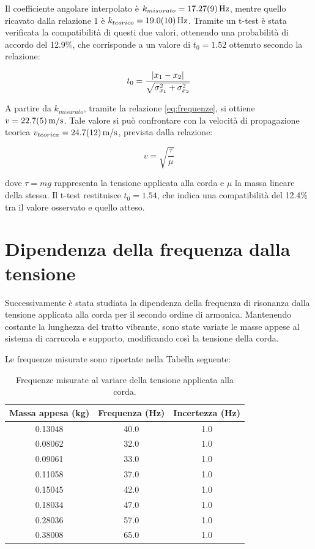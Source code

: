 Il coefficiente angolare interpolato è $k_{misurato} = \qty{17.27 \pm 0.09}{Hz}$, mentre quello ricavato dalla relazione 1 è $k_{teorico} = \qty{19.0 \pm 1.0}{Hz}$. Tramite un t-test  è  stata verificata la compatibilità di questi due valori, ottenendo una probabilità di accordo del 12.9\%, che corrisponde a un valore di $t_0 = 1.52$ ottenuto secondo la relazione:

\begin{equation}
t_0 = \frac{\lvert x_1-x_2\rvert}{\sqrt{{\sigma}_{x_1}^2+{\sigma}_{x_2}^2}}
\label{eq:t_test}
\end{equation}

 A partire da $k_{misurato}$, tramite la relazione \eqref{eq:frequenze}, si ottiene $v = \qty{22.7 \pm 0.5}{m/s}$. Tale valore si può confrontare con la velocità di propagazione teorica $v_{teorica} = \qty{24.7 \pm 1.2}{m/s}$, prevista dalla relazione:

\begin{equation}
  v = \sqrt{\frac{\tau}{\mu}} 
  \label{eq:velocità-propagazione}
\end{equation}

dove $\tau = mg$ rappresenta la tensione applicata alla corda e $\mu$ la massa lineare della stessa. Il t-test restituisce $t_0 = 1.54$, che indica una compatibilità del 12.4\% tra il valore osservato e quello atteso.

\section{Dipendenza della frequenza dalla tensione}

Successivamente è stata studiata la dipendenza della frequenza di risonanza  dalla tensione applicata alla corda per il secondo ordine di armonica.  
Mantenendo costante la lunghezza del tratto vibrante, sono state variate le masse appese al sistema di carrucola e supporto, modificando così la tensione della corda.

Le frequenze misurate sono riportate nella Tabella seguente:

\begin{table}[H]
\centering
\begin{tabular}{ccc}
\hline
Massa appesa (\unit{kg}) & Frequenza (\unit{Hz}) & Incertezza (\unit{Hz}) \\
\hline
0.13048 & 40.0 & 1.0 \\
0.08062 & 32.0 & 1.0 \\
0.09061 & 33.0 & 1.0 \\
0.11058 & 37.0 & 1.0 \\
0.15045 & 42.0 & 1.0 \\
0.18034 & 47.0 & 1.0 \\
0.28036 & 57.0 & 1.0 \\
0.38008 & 65.0 & 1.0 \\
\hline
\end{tabular}
\caption{Frequenze misurate al variare della tensione applicata alla corda.}
\end{table}


